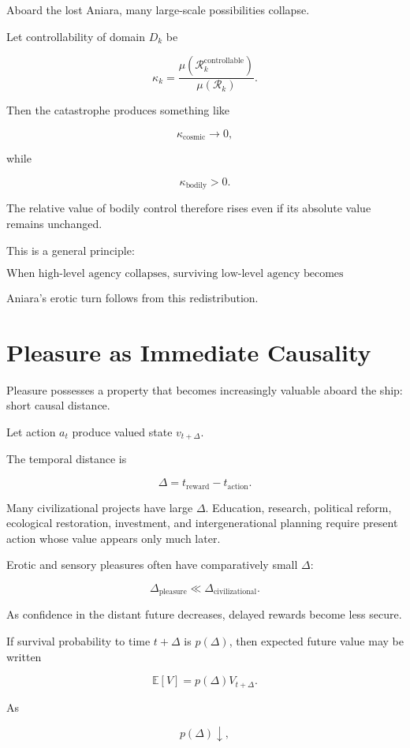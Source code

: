 \documentclass[11pt,oneside]{book}
\theoremstyle{definition}
\theoremstyle{remark}
\newcommand{\R}{\mathcal{R}}
\begin{document}
Aboard the lost Aniara, many large-scale possibilities collapse.

Let controllability of domain \(D_k\) be

\[
\kappa_k
=
\frac{
\mu(\R_k^{\mathrm{controllable}})
}{
\mu(\R_k)
}.
\]

Then the catastrophe produces something like

\[
\kappa_{\mathrm{cosmic}}
\rightarrow0,
\]

while

\[
\kappa_{\mathrm{bodily}}>0.
\]

The relative value of bodily control therefore rises even if its absolute value remains unchanged.

This is a general principle:

\[
\boxed{
\text{When high-level agency collapses, surviving low-level agency becomes disproportionately salient.}
}
\]

Aniara's erotic turn follows from this redistribution.

\section{Pleasure as Immediate Causality}

Pleasure possesses a property that becomes increasingly valuable aboard the ship: short causal distance.

Let action \(a_t\) produce valued state \(v_{t+\Delta}\).

The temporal distance is

\[
\Delta
=
t_{\mathrm{reward}}-t_{\mathrm{action}}.
\]

Many civilizational projects have large \(\Delta\). Education, research, political reform, ecological restoration, investment, and intergenerational planning require present action whose value appears only much later.

Erotic and sensory pleasures often have comparatively small \(\Delta\):

\[
\Delta_{\mathrm{pleasure}}
\ll
\Delta_{\mathrm{civilizational}}.
\]

As confidence in the distant future decreases, delayed rewards become less secure.

If survival probability to time \(t+\Delta\) is \(p(\Delta)\), then expected future value may be written

\[
\mathbb E[V]
=
p(\Delta)V_{t+\Delta}.
\]

As

\[
p(\Delta)\downarrow,
\]
\end{document}
